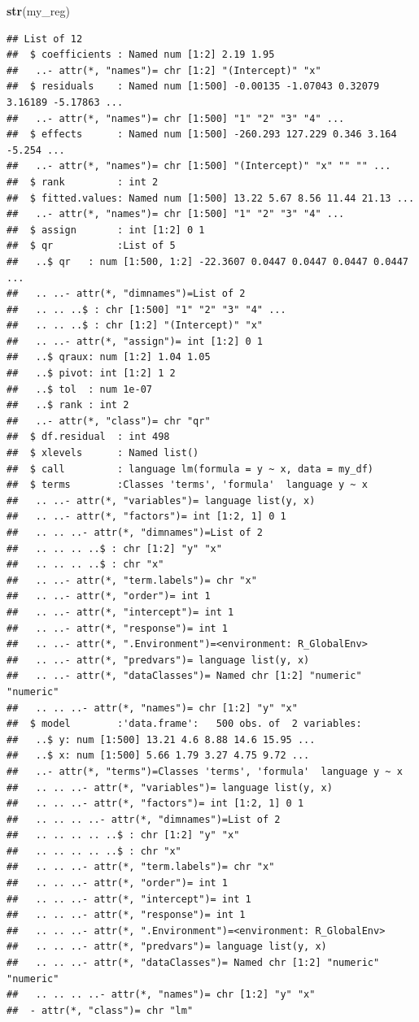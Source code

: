 \documentclass[]{book}
\newenvironment{Shaded}{\begin{snugshade}}{\end{snugshade}}
\newcommand{\KeywordTok}[1]{\textcolor[rgb]{0.13,0.29,0.53}{\textbf{#1}}}
\newcommand{\NormalTok}[1]{#1}
\theoremstyle{definition}
\theoremstyle{definition}
\theoremstyle{definition}
\theoremstyle{remark}
\begin{document}
\begin{Shaded}
\begin{Highlighting}[]
\KeywordTok{str}\NormalTok{(my_reg)}
\end{Highlighting}
\end{Shaded}

\begin{verbatim}
## List of 12
##  $ coefficients : Named num [1:2] 2.19 1.95
##   ..- attr(*, "names")= chr [1:2] "(Intercept)" "x"
##  $ residuals    : Named num [1:500] -0.00135 -1.07043 0.32079 3.16189 -5.17863 ...
##   ..- attr(*, "names")= chr [1:500] "1" "2" "3" "4" ...
##  $ effects      : Named num [1:500] -260.293 127.229 0.346 3.164 -5.254 ...
##   ..- attr(*, "names")= chr [1:500] "(Intercept)" "x" "" "" ...
##  $ rank         : int 2
##  $ fitted.values: Named num [1:500] 13.22 5.67 8.56 11.44 21.13 ...
##   ..- attr(*, "names")= chr [1:500] "1" "2" "3" "4" ...
##  $ assign       : int [1:2] 0 1
##  $ qr           :List of 5
##   ..$ qr   : num [1:500, 1:2] -22.3607 0.0447 0.0447 0.0447 0.0447 ...
##   .. ..- attr(*, "dimnames")=List of 2
##   .. .. ..$ : chr [1:500] "1" "2" "3" "4" ...
##   .. .. ..$ : chr [1:2] "(Intercept)" "x"
##   .. ..- attr(*, "assign")= int [1:2] 0 1
##   ..$ qraux: num [1:2] 1.04 1.05
##   ..$ pivot: int [1:2] 1 2
##   ..$ tol  : num 1e-07
##   ..$ rank : int 2
##   ..- attr(*, "class")= chr "qr"
##  $ df.residual  : int 498
##  $ xlevels      : Named list()
##  $ call         : language lm(formula = y ~ x, data = my_df)
##  $ terms        :Classes 'terms', 'formula'  language y ~ x
##   .. ..- attr(*, "variables")= language list(y, x)
##   .. ..- attr(*, "factors")= int [1:2, 1] 0 1
##   .. .. ..- attr(*, "dimnames")=List of 2
##   .. .. .. ..$ : chr [1:2] "y" "x"
##   .. .. .. ..$ : chr "x"
##   .. ..- attr(*, "term.labels")= chr "x"
##   .. ..- attr(*, "order")= int 1
##   .. ..- attr(*, "intercept")= int 1
##   .. ..- attr(*, "response")= int 1
##   .. ..- attr(*, ".Environment")=<environment: R_GlobalEnv> 
##   .. ..- attr(*, "predvars")= language list(y, x)
##   .. ..- attr(*, "dataClasses")= Named chr [1:2] "numeric" "numeric"
##   .. .. ..- attr(*, "names")= chr [1:2] "y" "x"
##  $ model        :'data.frame':   500 obs. of  2 variables:
##   ..$ y: num [1:500] 13.21 4.6 8.88 14.6 15.95 ...
##   ..$ x: num [1:500] 5.66 1.79 3.27 4.75 9.72 ...
##   ..- attr(*, "terms")=Classes 'terms', 'formula'  language y ~ x
##   .. .. ..- attr(*, "variables")= language list(y, x)
##   .. .. ..- attr(*, "factors")= int [1:2, 1] 0 1
##   .. .. .. ..- attr(*, "dimnames")=List of 2
##   .. .. .. .. ..$ : chr [1:2] "y" "x"
##   .. .. .. .. ..$ : chr "x"
##   .. .. ..- attr(*, "term.labels")= chr "x"
##   .. .. ..- attr(*, "order")= int 1
##   .. .. ..- attr(*, "intercept")= int 1
##   .. .. ..- attr(*, "response")= int 1
##   .. .. ..- attr(*, ".Environment")=<environment: R_GlobalEnv> 
##   .. .. ..- attr(*, "predvars")= language list(y, x)
##   .. .. ..- attr(*, "dataClasses")= Named chr [1:2] "numeric" "numeric"
##   .. .. .. ..- attr(*, "names")= chr [1:2] "y" "x"
##  - attr(*, "class")= chr "lm"
\end{verbatim}
\end{document}
